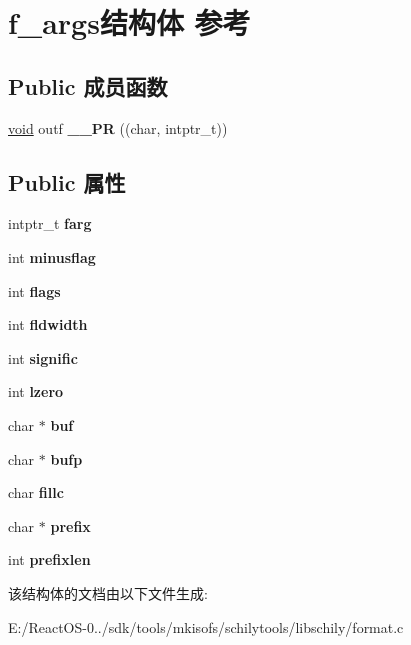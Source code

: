 \hypertarget{structf__args}{}\section{f\+\_\+args结构体 参考}
\label{structf__args}
\subsection*{Public 成员函数}
\begin{DoxyCompactItemize}
\item 
\mbox{\label{structf__args_a0764c8d62e725b21452bd7bf082d2a48}} 
\hyperlink{interfacevoid}{void} outf {\bfseries \+\_\+\+\_\+\+PR} ((char, intptr\+\_\+t))
\end{DoxyCompactItemize}
\subsection*{Public 属性}
\begin{DoxyCompactItemize}
\item 
\mbox{\label{structf__args_ae9a5f069c9d458c0ee33aa81dbc1524e}} 
intptr\+\_\+t {\bfseries farg}
\item 
\mbox{\label{structf__args_a718c803fc441ece43b2922da3fa75ac4}} 
int {\bfseries minusflag}
\item 
\mbox{\label{structf__args_ae24155aaf817f5a9a69205d22b03a9ff}} 
int {\bfseries flags}
\item 
\mbox{\label{structf__args_a489661187691ba3b4015983305c3c2e4}} 
int {\bfseries fldwidth}
\item 
\mbox{\label{structf__args_aaf7f146a6f141dcc465a17fcfbbd3217}} 
int {\bfseries signific}
\item 
\mbox{\label{structf__args_a0c4b910c2a2fb52c406f8ef128be7f0e}} 
int {\bfseries lzero}
\item 
\mbox{\label{structf__args_a1838540d4f49c5c7c03ca71f1fb944db}} 
char $\ast$ {\bfseries buf}
\item 
\mbox{\label{structf__args_a1dc59cd60750d609fe0ab0e784d78a3d}} 
char $\ast$ {\bfseries bufp}
\item 
\mbox{\label{structf__args_a9609a4e1f96fd61313544db990e41f82}} 
char {\bfseries fillc}
\item 
\mbox{\label{structf__args_a90df0ad1789ebc1fad34a53a76d9018b}} 
char $\ast$ {\bfseries prefix}
\item 
\mbox{\label{structf__args_a45302a2604219a22bf7f142cf259942f}} 
int {\bfseries prefixlen}
\end{DoxyCompactItemize}


该结构体的文档由以下文件生成\+:\begin{DoxyCompactItemize}
\item 
E\+:/\+React\+O\+S-\/0../sdk/tools/mkisofs/schilytools/libschily/format.\+c\end{DoxyCompactItemize}
